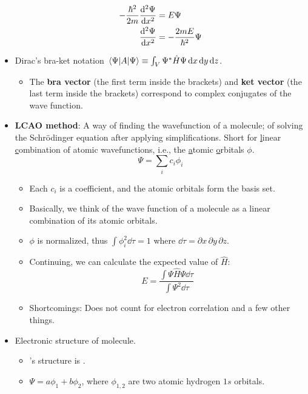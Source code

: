 \documentclass[../notes.tex]{subfiles}
\begin{document}
\begin{itemize}
    \begin{align*}
        -\frac{\hbar^2}{2m}\dv[2]{\Psi}{x} &= E\Psi\\
        \dv[2]{\Psi}{x} &= -\frac{2mE}{\hbar^2}\Psi
    \end{align*}
    \item Dirac's bra-ket notation $\ev{A}{\Psi}\equiv\int_V\Psi^*\hat{H}\Psi\dd{x}\dd{y}\dd{z}$.
    \begin{itemize}
        \item The \textbf{bra vector} (the first term inside the brackets) and \textbf{ket vector} (the last term inside the brackets) correspond to complex conjugates of the wave function.
    \end{itemize}
    \item \textbf{LCAO method}: A way of finding the wavefunction of a molecule; of solving the Schr\"{o}dinger equation after applying simplifications. Short for \underline{l}inear \underline{c}ombination of atomic wavefunctions, i.e., the \underline{a}tomic \underline{o}rbitals $\phi$.
    \begin{equation*}
        \Psi = \sum_ic_i\phi_i
    \end{equation*}
    \begin{itemize}
        \item Each $c_i$ is a coefficient, and the atomic orbitals form the basis set.
        \item Basically, we think of the wave function of a molecule as a linear combination of its atomic orbitals.
        \item $\phi$ is normalized, thus $\int\phi_i^2\dd{\tau}=1$ where $\dd{\tau}=\partial x\, \partial y\, \partial z$.
        \item Continuing, we can calculate the expected value of $\hat{H}$:
        \begin{equation*}
            E = \frac{\int\Psi\hat{H}\Psi\dd{\tau}}{\int\Psi^2\dd{\tau}}
        \end{equation*}
        \item Shortcomings: Does not count for electron correlation and a few other things.
    \end{itemize}
    \item Electronic structure of  molecule.
    \begin{itemize}
        \item {}'s structure is .
        \item $\Psi=a\phi_1+b\phi_2$, where $\phi_{1,2}$ are two atomic hydrogen $1s$ orbitals.

\end{itemize}
\end{itemize}
\end{document}
